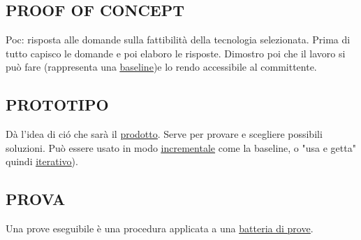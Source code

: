 		
		\subsection{PROOF OF CONCEPT}	 \label{poc}
		Poc: risposta alle domande sulla fattibilità  della tecnologia selezionata. Prima di tutto capisco le domande e poi elaboro le risposte. Dimostro poi che il lavoro si può fare (rappresenta una \underline{\hyperref[baseline]{baseline}})e lo rendo accessibile al committente.
			
		\subsection{PROTOTIPO}  \label{prototipo}
		Dà l'idea di ció che sarà il \underline{\hyperref[prodotto]{prodotto}}. Serve per provare e scegliere possibili soluzioni. Può essere usato in modo \underline{\hyperref[incremento]{incrementale}} come la baseline, o "usa e getta" quindi \underline{\hyperref[iterazione]{iterativo}}).
		
		\subsection{PROVA}		\label{prova} %
		Una prove eseguibile è una procedura applicata a una \underline{\hyperref[testsuite]{batteria di prove}}.
	
	
